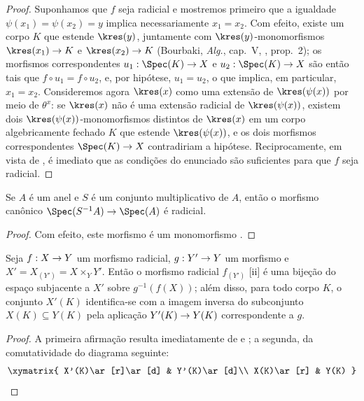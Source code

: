 \documentclass[oneside]{amsart}
\makeatletter
\newcommand{\ega@arrow}[2]{\mathchoice{#1}{#2}{#2}{#2}}
\renewcommand{\to}{\ega@arrow{\longrightarrow}{\rightarrow}}
\newcommand{\oldpage}[2][]{{\marginnote{\normalfont\textbf{#1}~|~#2}}\ignorespaces}
\let\EGAOriginalLabel\label
\renewcommand{\label}[1]{\phantomsection\EGAOriginalLabel{#1}}
\makeatother
\begin{document}
\begin{proof}
Suponhamos que $f$ seja radicial e mostremos primeiro que a igualdade
$\psi(x_1)=\psi(x_2)=y$ implica necessariamente $x_1=x_2$.
Com efeito, existe um corpo $K$ que estende $\kres(y)$, juntamente com
$\kres(y)$-monomorfismos $\kres(x_1)\to K$ e $\kres(x_2)\to K$ (Bourbaki,
\emph{Alg.}, cap.~V, , prop.~2); os morfismos correspondentes
$u_1:\Spec(K)\to X$ e $u_2:\Spec(K)\to X$ são então tais que
$f\circ u_1=f\circ u_2$, e, por hipótese, $u_1=u_2$, o que implica, em
particular, $x_1=x_2$.
Consideremos agora $\kres(x)$ como uma extensão de $\kres(\psi(x))$ por
meio de $\theta^x$: se $\kres(x)$ não é uma extensão radicial de
$\kres(\psi(x))$, existem dois $\kres(\psi(x))$-monomorfismos distintos de
$\kres(x)$ em um corpo algebricamente fechado $K$ que estende
$\kres(\psi(x))$, e os dois morfismos correspondentes $\Spec(K)\to X$
contradiriam a hipótese.
Reciprocamente, em vista de , é imediato que as condições do
enunciado são suficientes para que $f$ seja radicial.
\end{proof}

\begin{corollary}[3.5.9]
\label{I.3.5.9}
Se $A$ é um anel e $S$ é um conjunto multiplicativo de $A$, então o
morfismo canônico $\Spec(S^{-1}A)\to\Spec(A)$ é radicial.
\end{corollary}

\begin{proof}
Com efeito, este morfismo é um monomorfismo .
\end{proof}

\begin{corollary}[3.5.10]
\label{I.3.5.10}
Seja $f:X\to Y$ um morfismo radicial, $g:Y'\to Y$ um morfismo e
$X'=X_{(Y')}=X\times_Y Y'$.
Então o morfismo radicial $f_{(Y')}$ [ii] é uma bijeção do
espaço subjacente a $X'$ sobre $g^{-1}(f(X))$; além disso, para todo corpo
$K$, o conjunto $X'(K)$ identifica-se com a imagem inversa do subconjunto
$X(K)\subseteq Y(K)$ pela aplicação $Y'(K)\to Y(K)$ correspondente a $g$.
\end{corollary}

\begin{proof}
A primeira afirmação resulta imediatamente de  e
; a segunda, da comutatividade do diagrama seguinte:
\oldpage[I]{117}
\[
  \xymatrix{
    X'(K)\ar[r]\ar[d] &
    Y'(K)\ar[d]\\
    X(K)\ar[r] &
    Y(K)
  }
\]
\end{proof}
\end{document}
